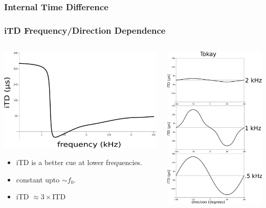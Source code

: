 \documentclass{beamer}
\begin{document}
\subsubsection{Internal Time Difference}
\begin{frame}[t]
\frametitle{iTD Frequency/Direction Dependence}
\begin{columns}
\begin{column}{0.5\textwidth}
 \includegraphics[width = 6 cm]{Diagrams/Presentation/iTDspectrum.png}
\begin{exampleblock}{}
\small
 \begin{itemize}
  \item iTD is a better cue at lower frequencies.
  \item constant upto $\sim f_0$.
  \item iTD $\approx  3\times$ITD
 \end{itemize}
\end{exampleblock}
\end{column}
     \begin{column}{0.5\textwidth}
     \flushright
 \includegraphics[width = 3.8 cm]{Diagrams/Presentation/iTDdirection.png}
\end{column}
\end{columns}
\end{frame}
\end{document}
